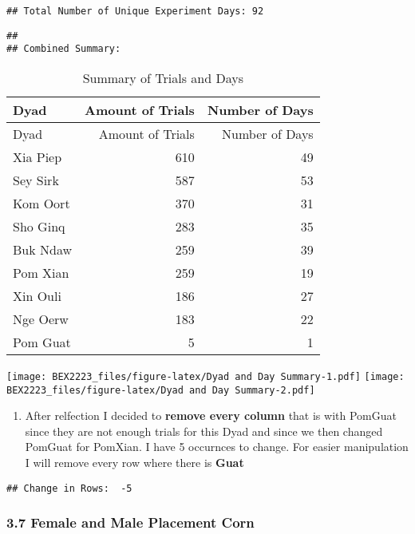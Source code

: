 \documentclass[
]{article}
\providecommand{\tightlist}{%
  \setlength{\itemsep}{0pt}\setlength{\parskip}{0pt}}
\begin{document}
\begin{verbatim}
## Total Number of Unique Experiment Days: 92
\end{verbatim}

\begin{verbatim}
## 
## Combined Summary:
\end{verbatim}

\begin{longtable}[]{@{}lrr@{}}
\caption{Summary of Trials and Days}\tabularnewline
\toprule
Dyad & Amount of Trials & Number of Days \\
\midrule
\endfirsthead
\toprule
Dyad & Amount of Trials & Number of Days \\
\midrule
\endhead
Xia Piep & 610 & 49 \\
Sey Sirk & 587 & 53 \\
Kom Oort & 370 & 31 \\
Sho Ginq & 283 & 35 \\
Buk Ndaw & 259 & 39 \\
Pom Xian & 259 & 19 \\
Xin Ouli & 186 & 27 \\
Nge Oerw & 183 & 22 \\
Pom Guat & 5 & 1 \\
\bottomrule
\end{longtable}

\texttt{[image: BEX2223\_files/figure-latex/Dyad and Day Summary-1.pdf]}
\texttt{[image: BEX2223\_files/figure-latex/Dyad and Day Summary-2.pdf]}

\begin{enumerate}
\def\labelenumi{\arabic{enumi}.}
\setcounter{enumi}{4}
\tightlist
\item
  After relfection I decided to \textbf{remove every column} that is
  with PomGuat since they are not enough trials for this Dyad and since
  we then changed PomGuat for PomXian. I have 5 occurnces to change. For
  easier manipulation I will remove every row where there is
  \textbf{Guat}
\end{enumerate}

\begin{verbatim}
## Change in Rows:  -5
\end{verbatim}

\hypertarget{female-and-male-placement-corn}{%
\subsubsection{3.7 Female and Male Placement
Corn}\label{female-and-male-placement-corn}}
\end{document}
